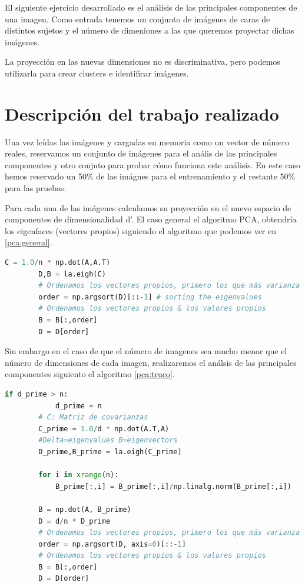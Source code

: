 El siguiente ejercicio desarrollado es el análisis de las principales componentes de una imagen. Como entrada tenemos un conjunto de imágenes de caras de distintos sujetos y el número de dimeniones a las que queremos proyectar dichas imágenes.\par
La proyección en las nuevas dimensiones no es discriminativa, pero podemos utilizarla para crear clusters e identificar imágenes. 

\section{Descripción del trabajo realizado}
Una vez leídas las imágenes y cargadas en memoria como un vector de número reales, reservamos un conjunto de imágenes para el anális de las principales componentes y otro conjuto para probar cómo funciona este análisis. En este caso hemos reservado un 50\% de las imágnes para el entrenamiento y el restante 50\% para las pruebas.\par
Para cada una de las imágenes calculamos su proyección en el nuevo espacio de componentes de dimensionalidad d'. 
El caso general el algoritmo PCA, obtendría los eigenfaces (vectores propios) siguiendo el algoritmo que podemos ver en \ref{pca:general}.\par

\begin{lstlisting}[language=python,label=pca:general,caption=PCA]
        C = 1.0/n * np.dot(A,A.T)
        D,B = la.eigh(C) 
        # Ordenamos los vectores propios, primero los que más varianza recogen 
        order = np.argsort(D)[::-1] # sorting the eigenvalues
        # Ordenamos los vectores propios & los valores propios
        B = B[:,order]
        D = D[order]
\end{lstlisting}

Sin embargo en el caso de que el número de imagenes sea mucho menor que el número de dimensiones de cada imagen, realizaremos el análsis de las principales componentes siguiento el algoritmo \ref{pca:truco}.\par

\begin{lstlisting}[language=python,label=pca:truco, caption=PCA cuado n es menor d]
        if d_prime > n:
            d_prime = n
        # C: Matriz de covarianzas
        C_prime = 1.0/d * np.dot(A.T,A)
        #Delta=eigenvalues B=eigenvectors
        D_prime,B_prime = la.eigh(C_prime)

        for i in xrange(n):
            B_prime[:,i] = B_prime[:,i]/np.linalg.norm(B_prime[:,i])

        B = np.dot(A, B_prime)
        D = d/n * D_prime
        # Ordenamos los vectores propios, primero los que más varianza recogen 
        order = np.argsort(D, axis=0)[::-1] 
        # Ordenamos los vectores propios & los valores propios
        B = B[:,order]
        D = D[order]

\end{lstlisting}

